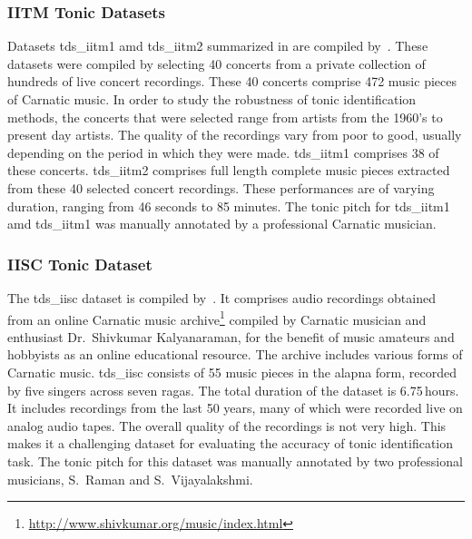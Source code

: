 {


\subsubsection{IITM Tonic Datasets}
\label{sec:corpus_iitm_tonic_datasets}

Datasets \acrshort{tds_iitm1} amd \acrshort{tds_iitm2} summarized in  are compiled by~\cite{bellur2012knowledge}. These datasets were compiled by selecting 40 concerts from a private collection of hundreds of live concert recordings. These 40 concerts comprise 472 music
pieces of Carnatic music. In order to study the robustness of tonic identification methods,
the concerts that were selected range from artists from the 1960's to present
day artists. The quality of the recordings vary from poor to good, usually depending on the period in which they were made. \acrshort{tds_iitm1} comprises 38 of these concerts. \acrshort{tds_iitm2} comprises full length complete music pieces extracted from these 40 selected concert recordings. These performances are of varying duration, ranging from 46 seconds to 85 minutes. The tonic pitch for \acrshort{tds_iitm1} amd \acrshort{tds_iitm1} was manually annotated by a professional Carnatic musician.


\subsubsection{IISC Tonic Dataset}
\label{sec:corpus_iisc_tonic_dataset}

The \acrshort{tds_iisc} dataset is compiled by~\cite{ranjani2011carnatic}. It comprises audio recordings obtained from an online Carnatic music archive\footnote{\url{http://www.shivkumar.org/music/index.html}} compiled by Carnatic musician and enthusiast Dr.~Shivkumar Kalyanaraman, for the benefit of music amateurs and hobbyists as an online educational resource. The archive includes various forms of Carnatic music. \acrshort{tds_iisc} consists of 55 music pieces in the \gls{alapna} form, recorded by five singers across seven \glspl{raga}. The total duration of the dataset is 6.75\,hours. It includes recordings from the last 50 years, many of which were recorded live on analog audio tapes. The overall quality of the recordings is not very high. This makes it a challenging dataset for evaluating the accuracy of tonic identification task. The tonic pitch for this dataset was manually annotated by two professional musicians, S.~Raman and S.~Vijayalakshmi.


}
